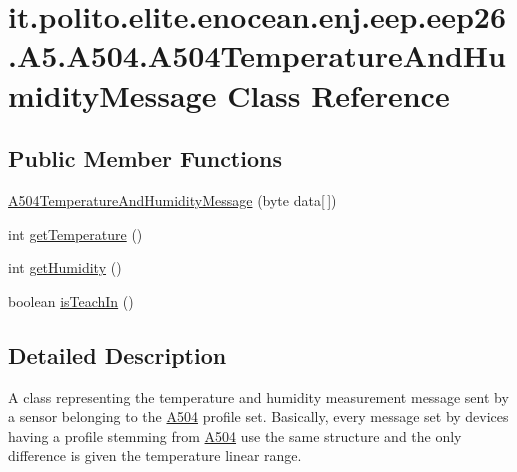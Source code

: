 \hypertarget{classit_1_1polito_1_1elite_1_1enocean_1_1enj_1_1eep_1_1eep26_1_1_a5_1_1_a504_1_1_a504_temperature_and_humidity_message}{}\section{it.\+polito.\+elite.\+enocean.\+enj.\+eep.\+eep26.\+A5.\+A504.\+A504\+Temperature\+And\+Humidity\+Message Class Reference}
\label{classit_1_1polito_1_1elite_1_1enocean_1_1enj_1_1eep_1_1eep26_1_1_a5_1_1_a504_1_1_a504_temperature_and_humidity_message}
\subsection*{Public Member Functions}
\begin{DoxyCompactItemize}
\item 
\hyperlink{classit_1_1polito_1_1elite_1_1enocean_1_1enj_1_1eep_1_1eep26_1_1_a5_1_1_a504_1_1_a504_temperature_and_humidity_message_a65db65bc8ebf42d6d6d9a14c3c2d8494}{A504\+Temperature\+And\+Humidity\+Message} (byte data\mbox{[}$\,$\mbox{]})
\item 
int \hyperlink{classit_1_1polito_1_1elite_1_1enocean_1_1enj_1_1eep_1_1eep26_1_1_a5_1_1_a504_1_1_a504_temperature_and_humidity_message_ae3fcde9b6d70ca2067670f89510deb42}{get\+Temperature} ()
\item 
int \hyperlink{classit_1_1polito_1_1elite_1_1enocean_1_1enj_1_1eep_1_1eep26_1_1_a5_1_1_a504_1_1_a504_temperature_and_humidity_message_a511fbd8b5864ea996c664375589c83f7}{get\+Humidity} ()
\item 
boolean \hyperlink{classit_1_1polito_1_1elite_1_1enocean_1_1enj_1_1eep_1_1eep26_1_1_a5_1_1_a504_1_1_a504_temperature_and_humidity_message_a78cbbdd322eac7e78f2cba43cbe6f75c}{is\+Teach\+In} ()
\end{DoxyCompactItemize}


\subsection{Detailed Description}
A class representing the temperature and humidity measurement message sent by a sensor belonging to the \hyperlink{classit_1_1polito_1_1elite_1_1enocean_1_1enj_1_1eep_1_1eep26_1_1_a5_1_1_a504_1_1_a504}{A504} profile set. Basically, every message set by devices having a profile stemming from \hyperlink{classit_1_1polito_1_1elite_1_1enocean_1_1enj_1_1eep_1_1eep26_1_1_a5_1_1_a504_1_1_a504}{A504} use the same structure and the only difference is given the temperature linear range.

